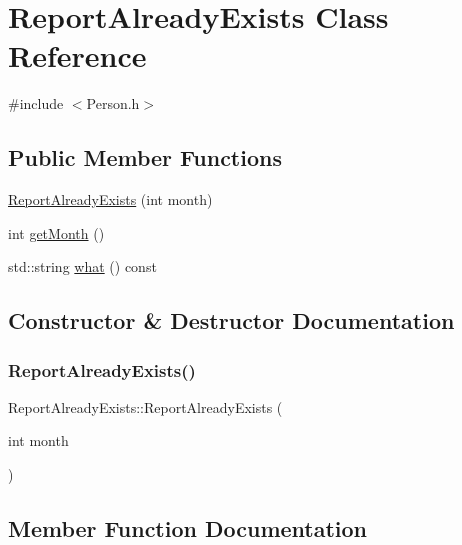 \hypertarget{class_report_already_exists}{}\section{Report\+Already\+Exists Class Reference}
\label{class_report_already_exists}


{\ttfamily \#include $<$Person.\+h$>$}

\subsection*{Public Member Functions}
\begin{DoxyCompactItemize}
\item 
\mbox{\hyperlink{class_report_already_exists_add9175e1939193586e63a421bf9d2870}{Report\+Already\+Exists}} (int month)
\item 
int \mbox{\hyperlink{class_report_already_exists_a1521d7f897144a910951b37f132cd922}{get\+Month}} ()
\item 
std\+::string \mbox{\hyperlink{class_report_already_exists_a66103e5ca6a4b84f3492493b7ced740d}{what}} () const
\end{DoxyCompactItemize}


\subsection{Constructor \& Destructor Documentation}
\mbox{\label{class_report_already_exists_add9175e1939193586e63a421bf9d2870}} 
\subsubsection{\texorpdfstring{Report\+Already\+Exists()}{ReportAlreadyExists()}}
{\footnotesize\ttfamily Report\+Already\+Exists\+::\+Report\+Already\+Exists (\begin{DoxyParamCaption}\item[{int}]{month }\end{DoxyParamCaption})\hspace{0.3cm}{\ttfamily [inline]}}



\subsection{Member Function Documentation}
\mbox{\label{class_report_already_exists_a1521d7f897144a910951b37f132cd922}} 
